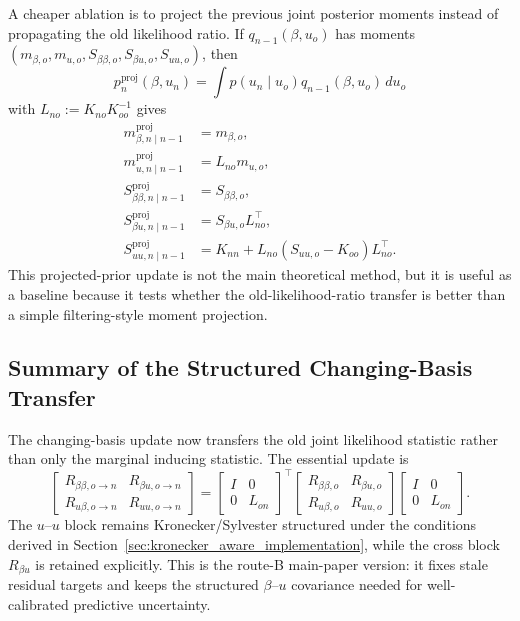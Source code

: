 \documentclass[12pt]{article}
\begin{document}
A cheaper ablation is to project the previous joint posterior moments instead of
propagating the old likelihood ratio. If
$q_{n-1}(\beta,u_o)$ has moments
$(m_{\beta,o},m_{u,o},S_{\beta\beta,o},S_{\beta u,o},S_{uu,o})$, then
\begin{equation}
    p_n^{\mathrm{proj}}(\beta,u_n)
    =
    \int p(u_n\mid u_o)q_{n-1}(\beta,u_o)\,du_o
\end{equation}
with $L_{no}:=K_{no}K_{oo}^{-1}$ gives
\begin{align}
    m_{\beta,n\mid n-1}^{\mathrm{proj}}&=m_{\beta,o},\\
    m_{u,n\mid n-1}^{\mathrm{proj}}&=L_{no}m_{u,o},\\
    S_{\beta\beta,n\mid n-1}^{\mathrm{proj}}&=S_{\beta\beta,o},\\
    S_{\beta u,n\mid n-1}^{\mathrm{proj}}&=S_{\beta u,o}L_{no}^\top,\\
    S_{uu,n\mid n-1}^{\mathrm{proj}}
    &=K_{nn}+L_{no}(S_{uu,o}-K_{oo})L_{no}^\top.
\end{align}
This projected-prior update is not the main theoretical method, but it is useful as a
baseline because it tests whether the old-likelihood-ratio transfer is better than a
simple filtering-style moment projection.

\subsection{Summary of the Structured Changing-Basis Transfer}
\label{subsec:changing_basis_summary}

The changing-basis update now transfers the old joint likelihood statistic rather than
only the marginal inducing statistic. The essential update is
\begin{equation}
    \begin{bmatrix}
        R_{\beta\beta,o\rightarrow n} & R_{\beta u,o\rightarrow n}\\
        R_{u\beta,o\rightarrow n} & R_{uu,o\rightarrow n}
    \end{bmatrix}
    =
    \begin{bmatrix}
        I & 0\\0 & L_{on}
    \end{bmatrix}^{\!\top}
    \begin{bmatrix}
        R_{\beta\beta,o} & R_{\beta u,o}\\
        R_{u\beta,o} & R_{uu,o}
    \end{bmatrix}
    \begin{bmatrix}
        I & 0\\0 & L_{on}
    \end{bmatrix}.
\end{equation}
The $u$--$u$ block remains Kronecker/Sylvester structured under the conditions derived
in Section~\ref{sec:kronecker_aware_implementation}, while the cross block
$R_{\beta u}$ is retained explicitly. This is the route-B main-paper version: it fixes
stale residual targets and keeps the structured $\beta$--$u$ covariance needed for
well-calibrated predictive uncertainty.
\end{document}
